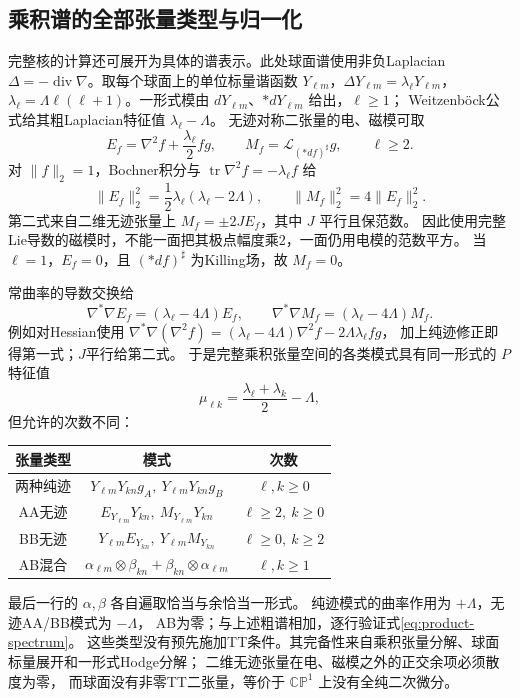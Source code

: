 \documentclass[UTF8,a4paper,11pt,fontset=fandol]{ctexart}
\numberwithin{equation}{section}
\theoremstyle{definition}
\newcommand{\tr}{\operatorname{tr}}
\newcommand{\CP}{\mathbb{CP}}
\begin{document}
\subsection{乘积谱的全部张量类型与归一化}\label{sec:productspectrum}
完整核的计算还可展开为具体的谱表示。此处球面谱使用非负Laplacian
$\Delta=-\operatorname{div}\nabla$。取每个球面上的单位标量谐函数
$Y_{\ell m}$，$\Delta Y_{\ell m}=\lambda_\ell Y_{\ell m}$，
$\lambda_\ell=\Lambda\ell(\ell+1)$。一形式模由
$dY_{\ell m}$、$*dY_{\ell m}$ 给出，$\ell\ge1$；
Weitzenböck公式给其粗Laplacian特征值 $\lambda_\ell-\Lambda$。
无迹对称二张量的电、磁模可取
\[
E_f=\nabla^2f+\frac{\lambda_\ell}{2}fg,
\qquad M_f=\mathcal L_{(*df)^\sharp}g,\qquad \ell\ge2.
\]
对 $\|f\|_2=1$，Bochner积分与 $\tr\nabla^2f=-\lambda_\ell f$ 给
\begin{equation}\label{eq:spherical-tensor-norms}
\|E_f\|_2^2=\frac12\lambda_\ell(\lambda_\ell-2\Lambda),
\qquad \|M_f\|_2^2=4\|E_f\|_2^2.
\end{equation}
第二式来自二维无迹张量上 $M_f=\pm2JE_f$，其中 $J$ 平行且保范数。
因此使用完整Lie导数的磁模时，不能一面把其极点幅度乘2，一面仍用电模的范数平方。
当 $\ell=1$，$E_f=0$，且 $(*df)^\sharp$ 为Killing场，故 $M_f=0$。

常曲率的导数交换给
\[
\nabla^*\nabla E_f=(\lambda_\ell-4\Lambda)E_f,
\qquad \nabla^*\nabla M_f=(\lambda_\ell-4\Lambda)M_f.
\]
例如对Hessian使用
$\nabla^*\nabla(\nabla^2f)=
(\lambda_\ell-4\Lambda)\nabla^2f-2\Lambda\lambda_\ell fg$，
加上纯迹修正即得第一式；$J$平行给第二式。
于是完整乘积张量空间的各类模式具有同一形式的 $P$ 特征值
\begin{equation}\label{eq:product-spectrum}
\mu_{\ell k}=\frac{\lambda_\ell+\lambda_k}{2}-\Lambda,
\end{equation}
但允许的次数不同：
\begin{center}
\small
\begin{tabular}{c c c}
\toprule
张量类型 & 模式 & 次数\\\midrule
两种纯迹 & $Y_{\ell m}Y_{kn}g_A,\ Y_{\ell m}Y_{kn}g_B$ & $\ell,k\ge0$\\
AA无迹 & $E_{Y_{\ell m}}Y_{kn},\ M_{Y_{\ell m}}Y_{kn}$ & $\ell\ge2,\ k\ge0$\\
BB无迹 & $Y_{\ell m}E_{Y_{kn}},\ Y_{\ell m}M_{Y_{kn}}$ & $\ell\ge0,\ k\ge2$\\
AB混合 & $\alpha_{\ell m}\otimes\beta_{kn}+\beta_{kn}\otimes\alpha_{\ell m}$ & $\ell,k\ge1$\\\bottomrule
\end{tabular}
\end{center}
最后一行的 $\alpha,\beta$ 各自遍取恰当与余恰当一形式。
纯迹模式的曲率作用为 $+\Lambda$，无迹AA/BB模式为 $-\Lambda$，
AB为零；与上述粗谱相加，逐行验证式\eqref{eq:product-spectrum}。
这些类型没有预先施加TT条件。其完备性来自乘积张量分解、球面标量展开和一形式Hodge分解；
二维无迹张量在电、磁模之外的正交余项必须散度为零，
而球面没有非零TT二张量，等价于 $\CP^1$ 上没有全纯二次微分。
\end{document}
